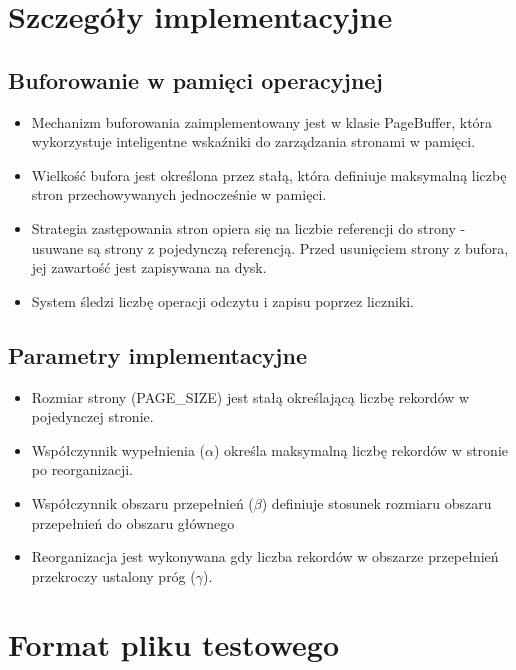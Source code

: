 \documentclass[12pt]{article}
\begin{document}
\section{Szczegóły implementacyjne}
\subsection{Buforowanie w pamięci operacyjnej}
\begin{itemize}
    \item Mechanizm buforowania zaimplementowany jest w klasie PageBuffer, która wykorzystuje inteligentne wskaźniki do zarządzania stronami w pamięci.
    
    \item Wielkość bufora jest określona przez stałą, która definiuje maksymalną liczbę stron przechowywanych jednocześnie w pamięci.
    
    \item Strategia zastępowania stron opiera się na liczbie referencji do strony - usuwane są strony z pojedynczą referencją. Przed usunięciem strony z bufora, jej zawartość jest zapisywana na dysk.
    
    \item System śledzi liczbę operacji odczytu i zapisu poprzez liczniki.
\end{itemize}

\subsection{Parametry implementacyjne}
\begin{itemize}
    \item Rozmiar strony (PAGE\_SIZE) jest stałą określającą liczbę rekordów w pojedynczej stronie.
    
    \item Współczynnik wypełnienia ($\alpha$) określa maksymalną liczbę rekordów w stronie po reorganizacji.
    
    \item Współczynnik obszaru przepełnień ($\beta$) definiuje stosunek rozmiaru obszaru przepełnień do obszaru głównego
    
    \item Reorganizacja jest wykonywana gdy liczba rekordów w obszarze przepełnień przekroczy ustalony próg ($\gamma$).
\end{itemize}

\section{Format pliku testowego}
\end{document}
